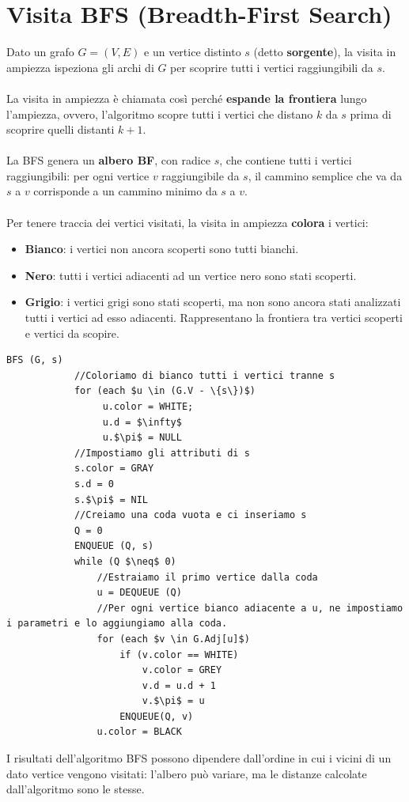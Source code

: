 \section{Visita BFS (Breadth-First Search)}
Dato un grafo $G = (V, E)$ e un vertice distinto $s$ (detto \textbf{sorgente}), la visita in ampiezza ispeziona gli archi di $G$ per scoprire tutti i vertici raggiungibili da $s$.\\\\
La visita in ampiezza è chiamata così perché \textbf{espande la frontiera} lungo l'ampiezza, ovvero, l'algoritmo scopre tutti i vertici che distano $k$ da $s$ prima di scoprire quelli distanti $k + 1$. \\\\
La BFS genera un \textbf{albero BF}, con radice $s$, che contiene tutti i vertici raggiungibili: per ogni vertice $v$ raggiungibile da $s$, il cammino semplice che va da $s$ a $v$ corrisponde a un cammino minimo da $s$ a $v$.\\\\
Per tenere traccia dei vertici visitati, la visita in ampiezza \textbf{colora} i vertici:
    \begin{itemize}
        \item{\textbf{Bianco}: i vertici non ancora scoperti sono tutti bianchi.}
        \item{\textbf{Nero}: tutti i vertici adiacenti ad un vertice nero sono stati scoperti.}
        \item{\textbf{Grigio}: i vertici grigi sono stati scoperti, ma non sono ancora stati analizzati tutti i vertici ad esso adiacenti. Rappresentano la frontiera tra vertici scoperti e vertici da scopire.}
    \end{itemize}

    \begin{lstlisting}[caption = BFS]
        BFS (G, s)
            //Coloriamo di bianco tutti i vertici tranne s
            for (each $u \in (G.V - \{s\})$)
                 u.color = WHITE;
                 u.d = $\infty$
                 u.$\pi$ = NULL
            //Impostiamo gli attributi di s
            s.color = GRAY
            s.d = 0
            s.$\pi$ = NIL 
            //Creiamo una coda vuota e ci inseriamo s
            Q = 0
            ENQUEUE (Q, s)
            while (Q $\neq$ 0)
                //Estraiamo il primo vertice dalla coda
                u = DEQUEUE (Q)
                //Per ogni vertice bianco adiacente a u, ne impostiamo i parametri e lo aggiungiamo alla coda.
                for (each $v \in G.Adj[u]$)
                    if (v.color == WHITE)
                        v.color = GREY
                        v.d = u.d + 1
                        v.$\pi$ = u
                    ENQUEUE(Q, v)
                u.color = BLACK
    \end{lstlisting}
I risultati dell'algoritmo BFS possono dipendere dall'ordine in cui i vicini di un dato vertice vengono visitati: l'albero può variare, ma le distanze calcolate dall'algoritmo sono le stesse.

